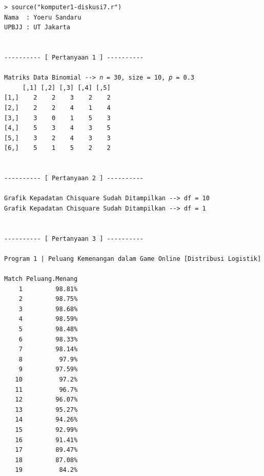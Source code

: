\begin{lstlisting}[basicstyle=\small\ttfamily]
> source("komputer1-diskusi7.r")
Nama  : Yoeru Sandaru
UPBJJ : UT Jakarta


---------- [ Pertanyaan 1 ] ----------

Matriks Data Binomial --> 𝑛 = 30, size = 10, 𝑝 = 0.3
     [,1] [,2] [,3] [,4] [,5]
[1,]    2    2    3    2    2
[2,]    2    2    4    1    4
[3,]    3    0    1    5    3
[4,]    5    3    4    3    5
[5,]    3    2    4    3    3
[6,]    5    1    5    2    2


---------- [ Pertanyaan 2 ] ----------

Grafik Kepadatan Chisquare Sudah Ditampilkan --> df = 10
Grafik Kepadatan Chisquare Sudah Ditampilkan --> df = 1


---------- [ Pertanyaan 3 ] ----------

Program 1 | Peluang Kemenangan dalam Game Online [Distribusi Logistik]

Match Peluang.Menang
    1         98.81%
    2         98.75%
    3         98.68%
    4         98.59%
    5         98.48%
    6         98.33%
    7         98.14%
    8          97.9%
    9         97.59%
   10          97.2%
   11          96.7%
   12         96.07%
   13         95.27%
   14         94.26%
   15         92.99%
   16         91.41%
   17         89.47%
   18         87.08%
   19          84.2%
\end{lstlisting}